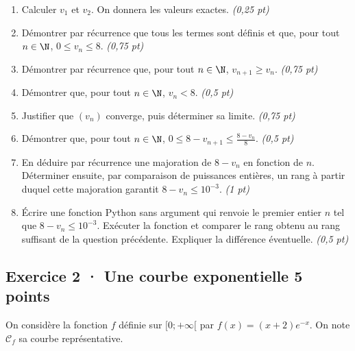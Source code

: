 \begin{enumerate}

\item Calculer $v_1$ et $v_2$. On donnera les valeurs exactes. \hfill\textit{(0,25 pt)}

\item Démontrer par récurrence que tous les termes sont définis et que, pour tout $n\in\N$, $0\le v_n\le8$. \hfill\textit{(0,75 pt)}

\item Démontrer par récurrence que, pour tout $n\in\N$, $v_{n+1}\ge v_n$. \hfill\textit{(0,75 pt)}

\item Démontrer que, pour tout $n\in\N$, $v_n<8$. \hfill\textit{(0,5 pt)}

\item Justifier que $(v_n)$ converge, puis déterminer sa limite. \hfill\textit{(0,75 pt)}

\item Démontrer que, pour tout $n\in\N$, $0\le 8-v_{n+1}\le\frac{8-v_n}{8}$. \hfill\textit{(0,5 pt)}

\item En déduire par récurrence une majoration de $8-v_n$ en fonction de $n$. Déterminer ensuite, par comparaison de puissances entières, un rang à partir duquel cette majoration garantit $8-v_n\le10^{-3}$. \hfill\textit{(1 pt)}

\item Écrire une fonction Python sans argument qui renvoie le premier entier $n$ tel que $8-v_n\le10^{-3}$. Exécuter la fonction et comparer le rang obtenu au rang suffisant de la question précédente. Expliquer la différence éventuelle. \hfill\textit{(0,5 pt)}

\end{enumerate}

\subsection*{Exercice 2 · Une courbe exponentielle \hfill 5 points}On considère la fonction $f$ définie sur $[0;+\infty[$ par $f(x)=(x+2)e^{-x}$. On note $\mathcal C_f$ sa courbe représentative.

